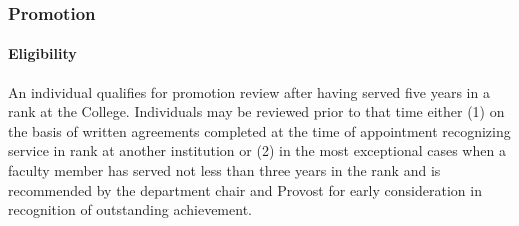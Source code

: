 \documentclass[letterpaper, 11pt]{article}
\begin{document}
		\subsubsection{Promotion}
			\paragraph{Eligibility}
				An individual qualifies for promotion review after having served five years in a rank at the College.  Individuals may be reviewed prior to that time either (1) on the basis of written agreements completed at the time of appointment recognizing service in rank at another institution or (2) in the most exceptional cases when a faculty member has served not less than three years in the rank and is recommended by the department chair and Provost for early consideration in recognition of outstanding achievement.
\end{document}
